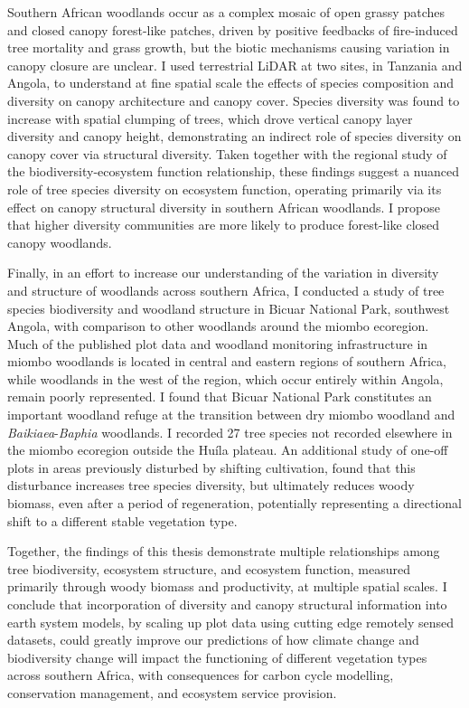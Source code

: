 Southern African woodlands occur as a complex mosaic of open grassy patches and closed canopy forest-like patches, driven by positive feedbacks of fire-induced tree mortality and grass growth, but the biotic mechanisms causing variation in canopy closure are unclear. I used terrestrial LiDAR at two sites, in Tanzania and Angola, to understand at fine spatial scale the effects of species composition and diversity on canopy architecture and canopy cover. Species diversity was found to increase with spatial clumping of trees, which drove vertical canopy layer diversity and canopy height, demonstrating an indirect role of species diversity on canopy cover via structural diversity. Taken together with the regional study of the biodiversity-ecosystem function relationship, these findings suggest a nuanced role of tree species diversity on ecosystem function, operating primarily via its effect on canopy structural diversity in southern African woodlands. I propose that higher diversity communities are more likely to produce forest-like closed canopy woodlands.

Finally, in an effort to increase our understanding of the variation in diversity and structure of woodlands across southern Africa, I conducted a study of tree species biodiversity and woodland structure in Bicuar National Park, southwest Angola, with comparison to other woodlands around the miombo ecoregion. Much of the published plot data and woodland monitoring infrastructure in miombo woodlands is located in central and eastern regions of southern Africa, while woodlands in the west of the region, which occur entirely within Angola, remain poorly represented. I found that Bicuar National Park constitutes an important woodland refuge at the transition between dry miombo woodland and \textit{Baikiaea}-\textit{Baphia} woodlands. I recorded 27 tree species not recorded elsewhere in the miombo ecoregion outside the Hu\'{i}la plateau. An additional study of one-off plots in areas previously disturbed by shifting cultivation, found that this disturbance increases tree species diversity, but ultimately reduces woody biomass, even after a period of regeneration, potentially representing a directional shift to a different stable vegetation type.

Together, the findings of this thesis demonstrate multiple relationships among tree biodiversity, ecosystem structure, and ecosystem function, measured primarily through woody biomass and productivity, at multiple spatial scales. I conclude that incorporation of diversity and canopy structural information into earth system models, by scaling up plot data using cutting edge remotely sensed datasets, could greatly improve our predictions of how climate change and biodiversity change will impact the functioning of different vegetation types across southern Africa, with consequences for carbon cycle modelling, conservation management, and ecosystem service provision. 

